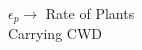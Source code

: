 \documentclass[preview]{standalone}
\begin{document}
\begin{center}
$\epsilon_p \rightarrow$ Rate of Plants\\Carrying CWD
\end{center}
\end{document}
